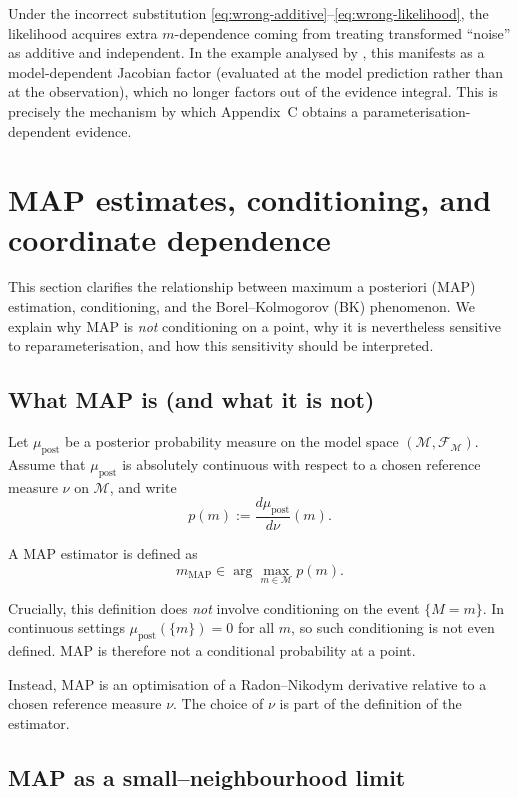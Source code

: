 \documentclass[11pt]{article}
\theoremstyle{remark}
\newcommand{\modelspace}{\mathcal{M}}
\begin{document}
Under the incorrect substitution \eqref{eq:wrong-additive}--\eqref{eq:wrong-likelihood}, the likelihood
acquires extra \(m\)-dependence coming from treating transformed ``noise'' as additive and independent.
In the example analysed by \citet{MosegaardCurtis2024}, this manifests as a model-dependent Jacobian
factor (evaluated at the model prediction rather than at the observation), which no longer factors out
of the evidence integral. This is precisely the mechanism by which Appendix~C obtains a
parameterisation-dependent evidence.


\section{MAP estimates, conditioning, and coordinate dependence}

This section clarifies the relationship between maximum a posteriori (MAP)
estimation, conditioning, and the Borel--Kolmogorov (BK) phenomenon. We explain
why MAP is \emph{not} conditioning on a point, why it is nevertheless sensitive
to reparameterisation, and how this sensitivity should be interpreted.

\subsection{What MAP is (and what it is not)}

Let \(\mu_{\text{post}}\) be a posterior probability measure on the model space
\((\modelspace,\mathcal F_{\modelspace})\). Assume that \(\mu_{\text{post}}\) is
absolutely continuous with respect to a chosen reference measure \(\nu\) on
\(\modelspace\), and write
\[
p(m) := \frac{d\mu_{\text{post}}}{d\nu}(m).
\]

A MAP estimator is defined as
\[
m_{\text{MAP}} \in \arg\max_{m\in\modelspace} p(m).
\]

Crucially, this definition does \emph{not} involve conditioning on the event
\(\{M=m\}\). In continuous settings \(\mu_{\text{post}}(\{m\})=0\) for all
\(m\), so such conditioning is not even defined. MAP is therefore not a
conditional probability at a point.

Instead, MAP is an optimisation of a Radon--Nikodym derivative relative to a
chosen reference measure \(\nu\). The choice of \(\nu\) is part of the
definition of the estimator.

\subsection{MAP as a small--neighbourhood limit}
\end{document}
